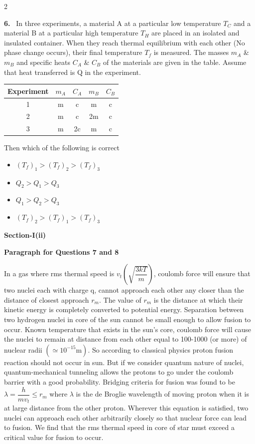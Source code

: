 \documentclass[10pt]{extarticle}
\newcommand{\sect}[1]{\par\smallskip\noindent\textbf{#1}\par}
\newcommand{\qn}[1]{\par\smallskip\noindent\textbf{#1.}~}
\newcommand{\paraq}[2]{\par\smallskip\noindent\textbf{Paragraph for Questions #1 and #2}\par}
\newenvironment{qoptions}{\begin{itemize}[leftmargin=1.8em,itemsep=1pt,topsep=2pt,label={}]}{\end{itemize}}
\newcommand{\opt}[2]{\item[(#1)] #2}
\begin{document}
\begin{multicols}{2}
\qn{6} In three experiments, a material A at a particular low temperature $T_C$ and a material B at a particular high temperature $T_H$ are placed in an isolated and insulated container. When they reach thermal equilibrium with each other (No phase change occurs), their final temperature $T_f$ is measured. The masses $m_A$ \& $m_B$ and specific heats $C_A$ \& $C_B$ of the materials are given in the table. Assume that heat transferred is Q in the experiment.\par\nobreak
\begin{center}\small
\begin{tabular}{|c|c|c|c|c|}
\hline
Experiment & $m_A$ & $C_A$ & $m_B$ & $C_B$ \\
\hline
1 & m & c & m & c \\
\hline
2 & m & c & 2m & c \\
\hline
3 & m & 2c & m & c \\
\hline
\end{tabular}
\end{center}
Then which of the following is correct
\begin{qoptions}
\opt{A}{$(T_f)_1>(T_f)_2>(T_f)_3$}
\opt{B}{$Q_2>Q_1>Q_3$}
\opt{C}{$Q_1>Q_2>Q_3$}
\opt{D}{$(T_f)_2>(T_f)_1>(T_f)_3$}
\end{qoptions}

\sect{Section-I(ii)}

\paraq{7}{8}
In a gas where rms thermal speed is $v_t\left(\sqrt{\dfrac{3kT}{m}}\right)$, coulomb force will ensure that two nuclei each with charge q, cannot approach each other any closer than the distance of closest approach $r_m$. The value of $r_m$ is the distance at which their kinetic energy is completely converted to potential energy. Separation between two hydrogen nuclei in core of the sun cannot be small enough to allow fusion to occur. Known temperature that exists in the sun's core, coulomb force will cause the nuclei to remain at distance from each other equal to 100-1000 (or more) of nuclear radii $\left(\simeq10^{-15}\text{m}\right)$. So according to classical physics proton fusion reaction should not occur in sun. But if we consider quantum nature of nuclei, quantum-mechanical tunneling allows the protons to go under the coulomb barrier with a good probability. Bridging criteria for fusion was found to be $\lambda=\dfrac{h}{mv_t}\leqslant r_m$ where $\lambda$ is the de Broglie wavelength of moving proton when it is at large distance from the other proton. Wherever this equation is satisfied, two nuclei can approach each other arbitrarily closely so that nuclear force can lead to fusion. We find that the rms thermal speed in core of star must exceed a critical value for fusion to occur.


\end{multicols}
\end{document}

